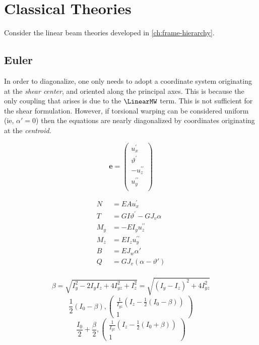 \chapter{Classical Theories}

Consider the linear beam theories developed in \cref{ch:frame-hierarchy}.

\section{Euler}

In order to diagonalize, one only needs to adopt a coordinate system originating at the \emph{shear center}, and oriented along the principal axes. This is because the only coupling that arises is due to the \(\LinearMW\) term.
%
This is not sufficient for the shear formulation. However, if torsional warping can be considered uniform (ie, \(\alpha' = 0\)) then the equations are nearly diagonalized by coordinates originating at the \emph{centroid}.

\begin{equation*}
\bm{e} = \begin{pmatrix} 
u_{x}^{\prime} \\ 
\vartheta^{\prime} \\ 
-u_z^{\prime\prime} \\ 
 u_y^{\prime\prime} \\
\end{pmatrix} 
\end{equation*}


\begin{equation*}
\begin{aligned}
N &= EA u_{x}^{\prime} \\ 
T &= G I \vartheta^{\prime} - G J_v \alpha \\ 
M_y &= -EI_y u_z^{\prime\prime} \\ 
M_z &=  EI_z u_y^{\prime\prime} \\
B   &= E J_w \alpha' \\
Q   &= G J_v ( \alpha - \vartheta' )\\
\end{aligned} 
\end{equation*}

$$
\beta = \sqrt{I_{y}^{2} - 2 I_{y} I_{z} + 4 I_{yz}^{2} + I_{z}^{2}}
= \sqrt{(I_y - I_z)^2 + 4 I_{yz}^2}
$$
$$
\frac{1}{2}(I_{0}-\beta),  
\begin{pmatrix}
\frac{1}{I_{yz}} \left(I_{z}- \frac{1}{2}( I_{0} - \beta)\right)\\
1
\end{pmatrix}
$$
$$
\frac{I_{0}}{2} + \frac{\beta}{2}, 
%
\begin{pmatrix}
\frac{1}{I_{yz}}
\left(
I_{z} -\frac{1}{2} \left(
  I_{0} + \beta
\right)
\right) \\
1
\end{pmatrix}
%
$$

